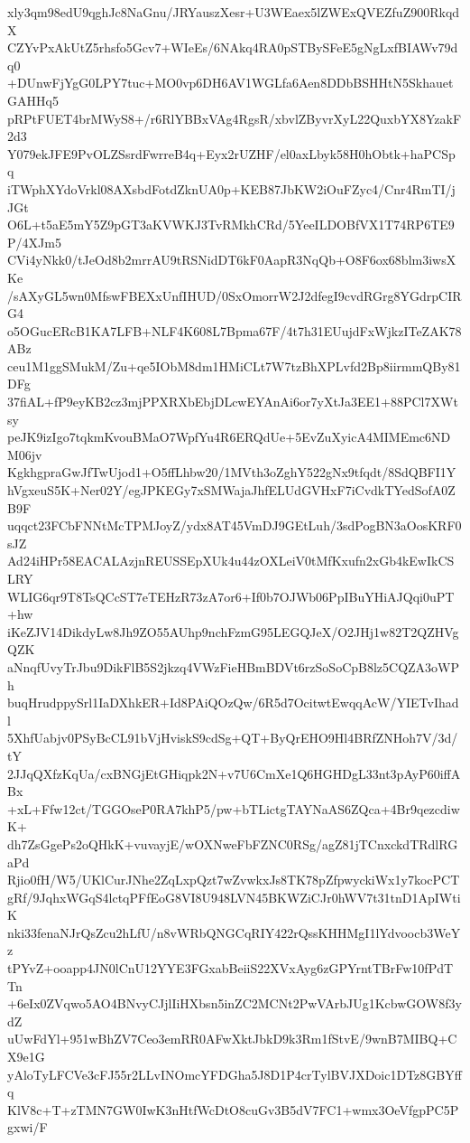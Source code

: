 xly3qm98edU9qghJc8NaGnu/JRYauszXesr+U3WEaex5lZWExQVEZfuZ900RkqdX
CZYvPxAkUtZ5rhsfo5Gcv7+WIeEs/6NAkq4RA0pSTBySFeE5gNgLxfBIAWv79dq0
+DUnwFjYgG0LPY7tuc+MO0vp6DH6AV1WGLfa6Aen8DDbBSHHtN5SkhauetGAHHq5
pRPtFUET4brMWyS8+/r6RlYBBxVAg4RgsR/xbvlZByvrXyL22QuxbYX8YzakF2d3
Y079ekJFE9PvOLZSsrdFwrreB4q+Eyx2rUZHF/el0axLbyk58H0hObtk+haPCSpq
iTWphXYdoVrkl08AXsbdFotdZknUA0p+KEB87JbKW2iOuFZyc4/Cnr4RmTI/jJGt
O6L+t5aE5mY5Z9pGT3aKVWKJ3TvRMkhCRd/5YeeILDOBfVX1T74RP6TE9P/4XJm5
CVi4yNkk0/tJeOd8b2mrrAU9tRSNidDT6kF0AapR3NqQb+O8F6ox68blm3iwsXKe
/sAXyGL5wn0MfswFBEXxUnfIHUD/0SxOmorrW2J2dfegI9cvdRGrg8YGdrpCIRG4
o5OGucERcB1KA7LFB+NLF4K608L7Bpma67F/4t7h31EUujdFxWjkzITeZAK78ABz
ceu1M1ggSMukM/Zu+qe5IObM8dm1HMiCLt7W7tzBhXPLvfd2Bp8iirmmQBy81DFg
37fiAL+fP9eyKB2cz3mjPPXRXbEbjDLcwEYAnAi6or7yXtJa3EE1+88PCl7XWtsy
peJK9izIgo7tqkmKvouBMaO7WpfYu4R6ERQdUe+5EvZuXyicA4MIMEmc6NDM06jv
KgkhgpraGwJfTwUjod1+O5ffLhbw20/1MVth3oZghY522gNx9tfqdt/8SdQBFI1Y
hVgxeuS5K+Ner02Y/egJPKEGy7xSMWajaJhfELUdGVHxF7iCvdkTYedSofA0ZB9F
uqqct23FCbFNNtMcTPMJoyZ/ydx8AT45VmDJ9GEtLuh/3sdPogBN3aOosKRF0sJZ
Ad24iHPr58EACALAzjnREUSSEpXUk4u44zOXLeiV0tMfKxufn2xGb4kEwIkCSLRY
WLIG6qr9T8TsQCcST7eTEHzR73zA7or6+If0b7OJWb06PpIBuYHiAJQqi0uPT+hw
iKeZJV14DikdyLw8Jh9ZO55AUhp9nchFzmG95LEGQJeX/O2JHj1w82T2QZHVgQZK
aNnqfUvyTrJbu9DikFlB5S2jkzq4VWzFieHBmBDVt6rzSoSoCpB8lz5CQZA3oWPh
buqHrudppySrl1IaDXhkER+Id8PAiQOzQw/6R5d7OcitwtEwqqAcW/YIETvIhadl
5XhfUabjv0PSyBcCL91bVjHviskS9cdSg+QT+ByQrEHO9Hl4BRfZNHoh7V/3d/tY
2JJqQXfzKqUa/cxBNGjEtGHiqpk2N+v7U6CmXe1Q6HGHDgL33nt3pAyP60iffABx
+xL+Ffw12ct/TGGOseP0RA7khP5/pw+bTLictgTAYNaAS6ZQca+4Br9qezcdiwK+
dh7ZsGgePs2oQHkK+vuvayjE/wOXNweFbFZNC0RSg/agZ81jTCnxckdTRdlRGaPd
Rjio0fH/W5/UKlCurJNhe2ZqLxpQzt7wZvwkxJs8TK78pZfpwyckiWx1y7kocPCT
gRf/9JqhxWGqS4lctqPFfEoG8VI8U948LVN45BKWZiCJr0hWV7t31tnD1ApIWtiK
nki33fenaNJrQsZcu2hLfU/n8vWRbQNGCqRIY422rQssKHHMgI1lYdvoocb3WeYz
tPYvZ+ooapp4JN0lCnU12YYE3FGxabBeiiS22XVxAyg6zGPYrntTBrFw10fPdTTn
+6eIx0ZVqwo5AO4BNvyCJjlIiHXbsn5inZC2MCNt2PwVArbJUg1KcbwGOW8f3ydZ
uUwFdYl+951wBhZV7Ceo3emRR0AFwXktJbkD9k3Rm1fStvE/9wnB7MIBQ+CX9e1G
yAloTyLFCVe3cFJ55r2LLvINOmcYFDGha5J8D1P4crTylBVJXDoic1DTz8GBYffq
KlV8c+T+zTMN7GW0IwK3nHtfWcDtO8cuGv3B5dV7FC1+wmx3OeVfgpPC5Pgxwi/F
